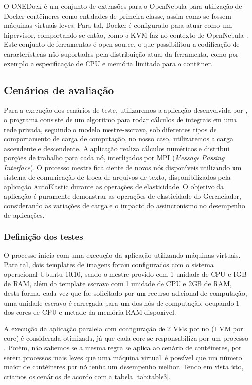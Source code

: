 \documentclass[twoside,english,brazilian]{UNISINOSartigo}
\begin{document}
O ONEDock é um conjunto de extensões para o OpenNebula para utilização de Docker contêineres como entidades de primeira classe, assim como se fossem máquinas virtuais leves. Para tal, Docker é configurado para atuar como um hipervisor, comportando-se então, como o KVM faz no contexto de OpenNebula \cite{onedock2015}. Este conjunto de ferramentas é open-source, o que possibilitou a codificação de características não suportadas pela distribuição atual da ferramenta, como por exemplo a especificação de CPU e memória limitada para o contêiner.

\subsection{Cenários de avaliação}
\label{cenarios}

Para a execução dos cenários de teste, utilizaremos a aplicação desenvolvida por , o programa consiste de um algoritmo para rodar cálculos de integrais em uma rede privada, seguindo o modelo mestre-escravo, sob diferentes tipos de comportamento de carga de computação, no nosso caso, utilizaremos a carga ascendente e descendente. A aplicação realiza cálculos numéricos e distribui porções de trabalho para cada nó, interligados por MPI (\textit{Message Passing Interface}). O processo mestre fica ciente de novos nós disponíveis utilizando um sistema de comunicação de troca de arquivos de texto, disponibilizados pela aplicação AutoElastic durante as operações de elasticidade. O objetivo da aplicação é puramente demonstrar as operações de elasticidade do Gerenciador, considerando as variações de carga e o impacto do assincronismo no desempenho de aplicações.

\subsubsection{Definição dos testes}

O processo inicia com uma execução da aplicação utilizando máquinas virtuais. Para tal, dois templates de imagens foram configurados com o sistema operacional Ubuntu 10.10, sendo o mestre provido com 1 unidade de CPU e 1GB de RAM, além do template escravo com 1 unidade de CPU e 2GB de RAM, desta forma, cada vez que for solicitado por um recurso adicional de computação, uma unidade escravo é carregada para um dos nós de computação, ocupando 1 dos cores de CPU e metade da memória RAM disponível.

A execução da aplicação paralela com configuração de 2 VMs por nó (1 VM por core) é considerada otimizada, já que cada core se responsabiliza por um processo \cite{7090978}. Porém, não sabemos se a mesma regra se aplica ao cenário de contêineres, por serem processos mais leves que uma máquina virtual, é possível que um número maior de contêineres por nó tenha um desempenho melhor. Tendo em vista isto, criamos os cenários de acordo com a tabela \ref{tab:table3}.
\end{document}
